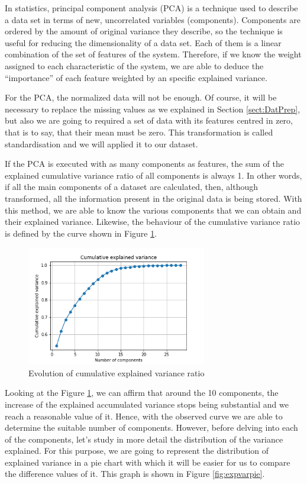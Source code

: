 In statistics, principal component analysis (PCA) is a technique used to describe a data set in terms of new, uncorrelated variables (components). Components are ordered by the amount of original variance they describe, so the technique is useful for reducing the dimensionality of a data set. Each of them is a linear combination of the set of features of the system. Therefore, if we know the weight assigned to each characteristic of the system, we are able to deduce the ``importance'' of each feature weighted by an specific explained variance.

For the PCA, the normalized data will not be enough. Of course, it will be necessary to replace the missing values as we explained in Section \ref{sect:DatPrep}, but also we are going to required a set of data with its features centred in zero, that is to say, that their mean must be zero. This transformation is called standardisation and we will applied it to our dataset.

If the PCA is executed with as many components as features, the sum of the explained cumulative variance ratio of all components is always 1. In other words, if all the main components of a dataset are calculated, then, although transformed, all the information present in the original data is being stored. With this method, we are able to know the various components that we can obtain and their explained variance. Likewise, the behaviour of the cumulative variance ratio is defined by the curve shown in Figure \ref{fig:cumexpvar}.

\begin{figure}
	\centering%
	\centerline{\includegraphics[width=0.7\textwidth]{Imagenes/Bitmap/PCA/cumexpvar.png}}%
	\caption{Evolution of cumulative explained variance ratio}%
	\label{fig:cumexpvar}
\end{figure}

Looking at the Figure \ref{fig:cumexpvar}, we can affirm that around the 10 components, the increase of the explained accumulated variance stops being substantial and we reach a reasonable value of it. Hence, with the observed curve we are able to determine the suitable number of components. However, before delving into each of the components, let's study in more detail the distribution of the variance explained. For this purpose, we are going to represent the distribution of explained variance in a pie chart with which it will be easier for us to compare the difference values of it. This graph is shown in Figure \ref{fig:expvarpie}.

